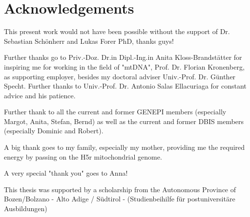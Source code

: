 \section*{Acknowledgements}


This present work would not have been possible without the support of Dr. Sebastian Sch\"onherr and Lukas Forer PhD, thanks guys! 

Further thanks go to Priv.-Doz. Dr.in Dipl.-Ing.in Anita Kloss-Brandst\"atter for inspiring me for working in the field of "mtDNA", Prof. Dr. Florian Kronenberg, as supporting employer, besides my doctoral adviser Univ.-Prof. Dr. G\"unther Specht. Further thanks to Univ.-Prof. Dr. Antonio Salas Ellacuriaga for constant advice and his patience.

Further thank to all the current and former GENEPI members (especially Margot, Anita, Stefan, Bernd) as well as the current and former DBIS members (especially Dominic and Robert).

A big thank goes to my family, especially my mother, providing me the required energy by passing on the H5r mitochondrial genome. 

A very special "thank you" goes to Anna! 

This thesis was supported by a scholarship from the Autonomous Province of Bozen/Bolzano - Alto Adige / S\"udtirol - (Studienbeihilfe f\"ur postuniversit\"are Ausbildungen)

 
%
\cleardoublepage
